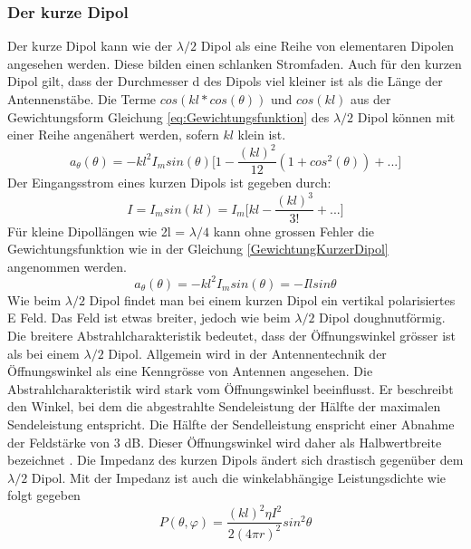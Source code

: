 \newpage
\subsubsection{Der kurze Dipol }\label{sec:kurzerDipol}
Der kurze Dipol kann wie der $\lambda /2$ Dipol als eine Reihe von elementaren Dipolen angesehen werden. Diese bilden einen schlanken Stromfaden. Auch für den kurzen Dipol gilt, dass der Durchmesser d des Dipols viel kleiner ist als die Länge der Antennenstäbe. 
Die Terme $cos(kl*cos(\theta)) $ und $cos(kl)$ aus der Gewichtungsform Gleichung \ref{eq:Gewichtungsfunktion}
 des $\lambda/2$ Dipol können mit einer Reihe angenähert werden, sofern $kl$ klein ist.
\begin{equation}
a_{\theta}(\theta)=-kl^{2}I_{m}sin(\theta) \lbrack 1- \frac{(kl)^{2}}{12}(1+cos^{2}(\theta))+...\rbrack
\end{equation}
Der Eingangsstrom eines kurzen Dipols ist gegeben durch:
\begin{equation}
I=I_{m}sin(kl)=I_{m}\lbrack kl - \frac{(kl)^{3}}{3!} +... \rbrack
\end{equation}
 Für kleine Dipollängen wie 2l = $\lambda/4 $ kann ohne grossen Fehler die Gewichtungsfunktion wie in der Gleichung \ref{GewichtungKurzerDipol}  angenommen werden.
\begin{equation}\label{GewichtungKurzerDipol}
a_{\theta}(\theta)=-kl^{2}I_{m}sin(\theta)=-Ilsin\theta
\end{equation}
Wie beim $\lambda/2$ Dipol findet man bei einem kurzen Dipol ein vertikal polarisiertes E Feld. Das Feld ist etwas breiter, jedoch wie beim $\lambda/2$ Dipol doughnutförmig. Die breitere Abstrahlcharakteristik  bedeutet, dass der Öffnungswinkel grösser ist als bei einem $\lambda/2$ Dipol. Allgemein wird in der Antennentechnik  der Öffnungswinkel als eine Kenngrösse von Antennen angesehen. Die Abstrahlcharakteristik wird stark vom Öffnungswinkel beeinflusst. Er beschreibt  den Winkel, bei dem die abgestrahlte Sendeleistung der Hälfte der maximalen Sendeleistung entspricht. Die Hälfte der Sendelleistung enspricht   einer Abnahme der Feldstärke von 3 dB. Dieser Öffnungswinkel wird  daher als Halbwertbreite bezeichnet \cite{Öffnungswinkel}.  Die Impedanz des kurzen Dipols ändert sich  drastisch gegenüber dem $\lambda/2$ Dipol. Mit der Impedanz ist auch die winkelabhängige Leistungsdichte wie folgt gegeben\cite{elliott1981antenna}
\begin{equation}
P(\theta,\varphi)=\frac{(kl)^{2}\eta I^{2}}{2(4\pi r)^{2}}sin^{2}\theta
\end{equation}
